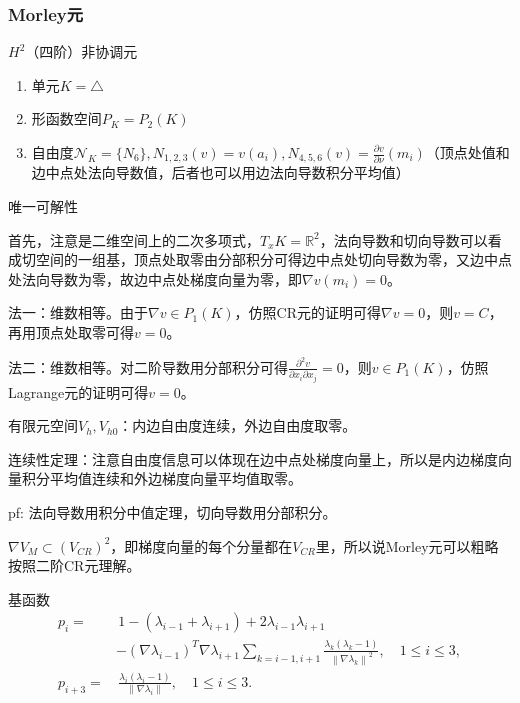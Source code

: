 \subsubsection{Morley元}

$H^2$（四阶）非协调元

\begin{enumerate}
  \item 单元$K = \triangle$
  \item 形函数空间$P_K = P_2(K)$
  \item 自由度$\mathcal{N}_K = \{N_{6}\}, N_{1, 2, 3}(v) = v(a_i), N_{4, 5, 6}(v)=\frac{\partial v}{\partial \nu}(m_i)$（顶点处值和边中点处法向导数值，后者也可以用边法向导数积分平均值）
\end{enumerate}

唯一可解性

首先，注意是二维空间上的二次多项式，$T_x K = \mathbb{R}^2$，法向导数和切向导数可以看成切空间的一组基，顶点处取零由分部积分可得边中点处切向导数为零，又边中点处法向导数为零，故边中点处梯度向量为零，即$\nabla v(m_i) = 0$。

法一：维数相等。由于$\nabla v \in P_1(K)$，仿照CR元的证明可得$\nabla v = 0$，则$v = C$，再用顶点处取零可得$v = 0$。

法二：维数相等。对二阶导数用分部积分可得$\frac{\partial^2 v}{\partial x_i \partial x_j} = 0$，则$v \in P_1(K)$，仿照Lagrange元的证明可得$v = 0$。

有限元空间$V_h, V_{h0}$：内边自由度连续，外边自由度取零。

连续性定理：注意自由度信息可以体现在边中点处梯度向量上，所以是内边梯度向量积分平均值连续和外边梯度向量平均值取零。

pf: 法向导数用积分中值定理，切向导数用分部积分。

$\nabla V_{M} \subset\left(V_{C R}\right)^{2}$，即梯度向量的每个分量都在$V_{CR}$里，所以说Morley元可以粗略按照二阶CR元理解。

基函数
\[
  \begin{aligned}
    p_{i}= & \, 1-\left(\lambda_{i-1}+\lambda_{i+1}\right)+2 \lambda_{i-1} \lambda_{i+1} \\
    & -\left(\nabla \lambda_{i-1}\right)^{T} \nabla \lambda_{i+1} \sum_{k=i-1, i+1} \frac{\lambda_{k}\left(\lambda_{k}-1\right)}{\left\|\nabla \lambda_{k}\right\|^{2}}, \quad 1 \le i \le 3, \\
    p_{i+3}= & \, \frac{\lambda_{i}\left(\lambda_{i}-1\right)}{\left\|\nabla \lambda_{i}\right\|}, \quad 1 \le i \le 3 .
  \end{aligned}
\]

